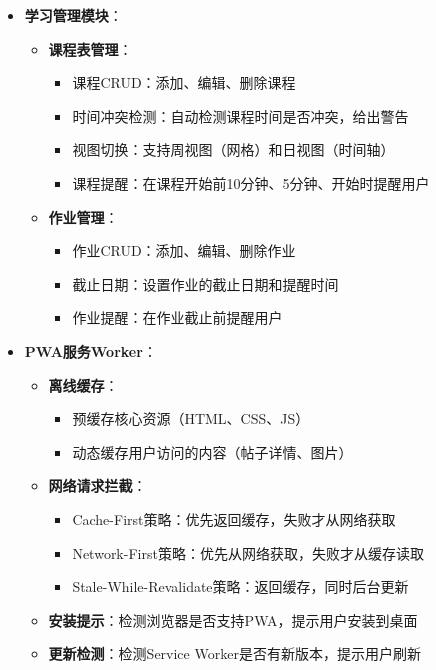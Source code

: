 \documentclass[12pt,a4paper]{article}
\begin{document}
\begin{itemize}
    \item \textbf{学习管理模块}：
        \begin{itemize}
            \item \textbf{课程表管理}：
                \begin{itemize}
                    \item 课程CRUD：添加、编辑、删除课程
                    \item 时间冲突检测：自动检测课程时间是否冲突，给出警告
                    \item 视图切换：支持周视图（网格）和日视图（时间轴）
                    \item 课程提醒：在课程开始前10分钟、5分钟、开始时提醒用户
                \end{itemize}
            \item \textbf{作业管理}：
                \begin{itemize}
                    \item 作业CRUD：添加、编辑、删除作业
                    \item 截止日期：设置作业的截止日期和提醒时间
                    \item 作业提醒：在作业截止前提醒用户
                \end{itemize}
        \end{itemize}
    
    \item \textbf{PWA服务Worker}：
        \begin{itemize}
            \item \textbf{离线缓存}：
                \begin{itemize}
                    \item 预缓存核心资源（HTML、CSS、JS）
                    \item 动态缓存用户访问的内容（帖子详情、图片）
                \end{itemize}
            \item \textbf{网络请求拦截}：
                \begin{itemize}
                    \item Cache-First策略：优先返回缓存，失败才从网络获取
                    \item Network-First策略：优先从网络获取，失败才从缓存读取
                    \item Stale-While-Revalidate策略：返回缓存，同时后台更新
                \end{itemize}
            \item \textbf{安装提示}：检测浏览器是否支持PWA，提示用户安装到桌面
            \item \textbf{更新检测}：检测Service Worker是否有新版本，提示用户刷新
        \end{itemize}
    

\end{itemize}
\end{document}
